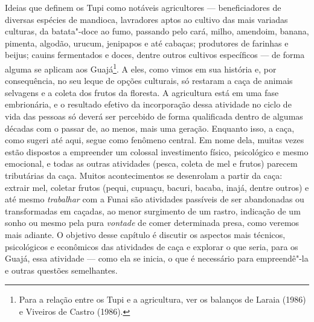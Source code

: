 \noindent Ideias que definem os Tupi como notáveis agricultores --- beneficiadores
de diversas espécies de mandioca, lavradores aptos ao cultivo das mais
variadas culturas, da batata"-doce ao fumo, passando pelo cará, milho,
amendoim, banana, pimenta, algodão, urucum, jenipapos e até cabaças;
produtores de farinhas e beijus; cauins fermentados e doces, dentre
outros cultivos específicos --- de forma alguma se aplicam aos
Guajá\footnote{Para a relação entre os Tupi e a agricultura, ver os
  balanços de Laraia (1986) e Viveiros de Castro (1986).}. A eles, como
vimos em sua história e, por consequência, no seu leque de opções
culturais, só restaram a caça de animais selvagens e a coleta dos frutos
da floresta. A agricultura está em uma fase embrionária, e o resultado
efetivo da incorporação dessa atividade no ciclo de vida das pessoas só
deverá ser percebido de forma qualificada dentro de algumas décadas com
o passar de, ao menos, mais uma geração. Enquanto isso, a caça, como
sugeri até aqui, segue como fenômeno central. Em nome dela, muitas vezes
estão dispostos a empreender um colossal investimento físico,
psicológico e mesmo emocional, e todas as outras atividades (pesca,
coleta de mel e frutos) parecem tributárias da caça. Muitos
acontecimentos se desenrolam a partir da caça: extrair mel, coletar
frutos (pequi, cupuaçu, bacuri, bacaba, inajá, dentre outros) e até
mesmo \emph{trabalhar} com a Funai são atividades passíveis de ser
abandonadas ou transformadas em caçadas, ao menor surgimento de um
rastro, indicação de um sonho ou mesmo pela pura \emph{vontade} de comer
determinada presa, como veremos mais adiante. O objetivo desse capítulo
é discutir os aspectos mais técnicos, psicológicos e econômicos das
atividades de caça e explorar o que seria, para os Guajá, essa atividade
--- como ela se inicia, o que é necessário para empreendê"-la e outras
questões semelhantes.

